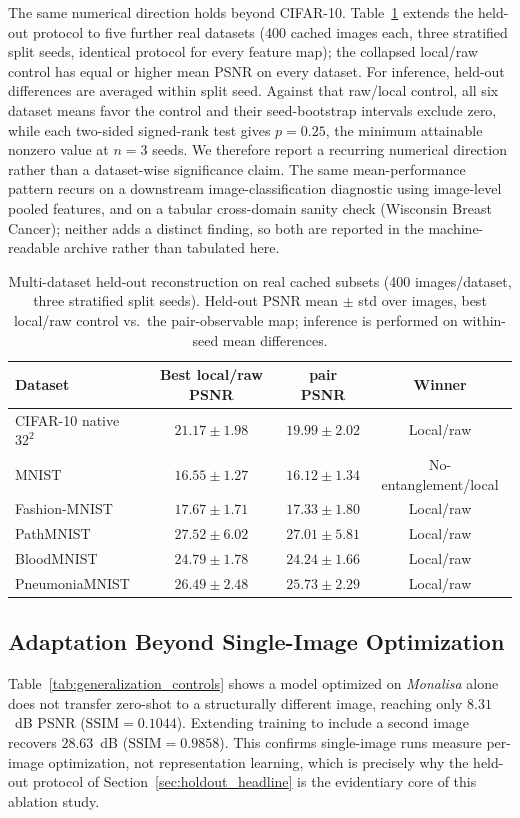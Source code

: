 \documentclass[11pt]{article}
\DeclareRobustCommand{\blue}[1]{\leavevmode{\color{blue}#1}}
\begin{document}
The same numerical direction holds beyond CIFAR-10. Table~\ref{tab:multi_dataset_reconstruction} extends the held-out protocol to five further real datasets (400 cached images each, three stratified split seeds, identical protocol for every feature map); the collapsed local/raw control has equal or higher mean PSNR on every dataset. For inference, held-out differences are averaged within split seed. Against that raw/local control, all six dataset means favor the control and their seed-bootstrap intervals exclude zero, while each two-sided signed-rank test gives $p=0.25$, the minimum attainable nonzero value at $n=3$ seeds. We therefore report a recurring numerical direction rather than a dataset-wise significance claim. The same mean-performance pattern recurs on a downstream image-classification diagnostic using image-level pooled features, and on a tabular cross-domain sanity check (Wisconsin Breast Cancer); neither adds a distinct finding, so both are reported in the machine-readable archive rather than tabulated here.

\begin{table}[H]
\centering
\caption{Multi-dataset held-out reconstruction on real cached subsets (400 images/dataset, three stratified split seeds). Held-out PSNR mean $\pm$ std over images, best local/raw control vs.\ the \blue{PCAE2D} pair-observable map; inference is performed on within-seed mean differences.}
\label{tab:multi_dataset_reconstruction}
\scriptsize
\begin{tabular}{lccc}
\toprule
Dataset & Best local/raw PSNR & \blue{PCAE2D} pair PSNR & Winner \\
\midrule
CIFAR-10 native $32^2$ & $21.17{\pm}1.98$ & $19.99{\pm}2.02$ & Local/raw \\
MNIST & $16.55{\pm}1.27$ & $16.12{\pm}1.34$ & No-entanglement/local \\
Fashion-MNIST & $17.67{\pm}1.71$ & $17.33{\pm}1.80$ & Local/raw \\
PathMNIST & $27.52{\pm}6.02$ & $27.01{\pm}5.81$ & Local/raw \\
BloodMNIST & $24.79{\pm}1.78$ & $24.24{\pm}1.66$ & Local/raw \\
PneumoniaMNIST & $26.49{\pm}2.48$ & $25.73{\pm}2.29$ & Local/raw \\
\bottomrule
\end{tabular}
\end{table}

\subsection{Adaptation Beyond Single-Image Optimization}
Table~\ref{tab:generalization_controls} shows a model optimized on \textit{Monalisa} alone does not transfer zero-shot to a structurally different image, reaching only $8.31$~dB PSNR ($\mathrm{SSIM}=0.1044$). Extending training to include a second image recovers $28.63$~dB ($\mathrm{SSIM}=0.9858$). This confirms single-image runs measure per-image optimization, not representation learning, which is precisely why the held-out protocol of Section~\ref{sec:holdout_headline} is the evidentiary core of this ablation study.
\end{document}
